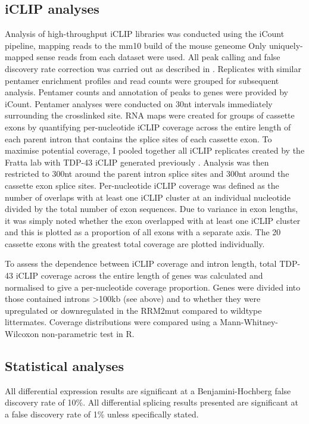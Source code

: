 \subsection{iCLIP analyses}
Analysis  of  high-throughput  iCLIP  libraries  was  conducted  using  the  iCount  pipeline,  mapping  reads  to  the mm10 build of the mouse geneome  Only  uniquely-mapped  sense  reads  from each dataset were used. All peak calling and false discovery rate correction was carried out as described in \citep{Huppertz2014-ip,Konig2010}. Replicates with similar pentamer enrichment profiles and read  counts were  grouped  for  subsequent analysis. Pentamer  counts and annotation  of  peaks  to genes were provided by iCount. Pentamer analyses were conducted on 30nt intervals immediately surrounding the crosslinked site. 
RNA maps were created  for groups of cassette exons by quantifying per-nucleotide iCLIP coverage across the entire length of each parent intron that contains the splice sites of each cassette exon. To maximise  potential  coverage,  I pooled together all  iCLIP  replicates created  by the Fratta lab with  TDP-43  iCLIP generated previously \citep{Rogelj2012}. Analysis was  then  restricted  to 300nt around  the parent intron splice sites and 300nt around the cassette exon splice sites. Per-nucleotide iCLIP coverage was defined as the number of overlaps with at least one iCLIP cluster at an individual nucleotide divided by the total number of exon sequences. Due to variance in exon lengths, it was simply noted whether the exon overlapped with at least one iCLIP cluster and this is plotted as a proportion of all exons with a separate axis. The 20 cassette exons with the greatest total coverage are plotted individually.

To assess  the  dependence between  iCLIP  coverage and  intron  length,  total TDP-43  iCLIP  coverage 
across  the entire length of genes was calculated and normalised  to give a per-nucleotide coverage 
proportion. Genes were divided into those contained introns >100kb (see above) and to whether they were  upregulated  or  downregulated in  the RRM2mut compared  to wildtype littermates.  Coverage distributions were compared using a Mann-Whitney-Wilcoxon non-parametric test in R.

\subsection{Statistical analyses}
All differential expression results are significant at a Benjamini-Hochberg false discovery rate of 10\%. 
All  differential  splicing  results  presented  are  significant  at  a  false  discovery  rate  of  1\%  unless specifically stated.



